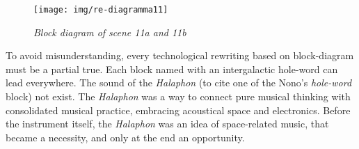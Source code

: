 \documentclass[twoside,a4paper]{article}
\begin{document}
%
%

\begin{figure}[ht]
\centerline{\texttt{[image: img/re-diagramma11]}}
\caption{\label{re-dia-6c}{\it Block diagram of scene 11a and 11b}}
\end{figure}

To avoid misunderstanding, every technological rewriting based on block-diagram
must be a partial true. Each block named with an intergalactic hole-word can
lead everywhere. The sound of the \emph{Halaphon} (to cite one of the Nono's
\emph{hole-word} block) not exist. The \emph{Halaphon} was a way to connect pure
musical thinking with consolidated musical practice, embracing acoustical space
and electronics. Before the instrument itself, the \emph{Halaphon} was an idea of
space-related music, that became a necessity, and only at the end an opportunity.
\end{document}
